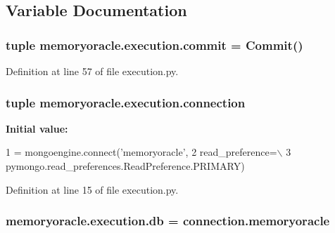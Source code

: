 \subsection{Variable Documentation}
\hypertarget{namespacememoryoracle_1_1execution_a1f4dd92e5fd65b6d5ac5d1631d09cf53}{}
\subsubsection[{commit}]{\setlength{\rightskip}{0pt plus 5cm}tuple memoryoracle.\+execution.\+commit = {\bf Commit}()}\label{namespacememoryoracle_1_1execution_a1f4dd92e5fd65b6d5ac5d1631d09cf53}


Definition at line 57 of file execution.\+py.

\hypertarget{namespacememoryoracle_1_1execution_a784a8c4d93752cd7436bde333f52572f}{}
\subsubsection[{connection}]{\setlength{\rightskip}{0pt plus 5cm}tuple memoryoracle.\+execution.\+connection}\label{namespacememoryoracle_1_1execution_a784a8c4d93752cd7436bde333f52572f}
{\bfseries Initial value\+:}
\begin{DoxyCode}
1 = mongoengine.connect(\textcolor{stringliteral}{'memoryoracle'},
2                     read\_preference=\(\backslash\)
3                             pymongo.read\_preferences.ReadPreference.PRIMARY)
\end{DoxyCode}


Definition at line 15 of file execution.\+py.

\hypertarget{namespacememoryoracle_1_1execution_ad0c5f80d3b0eb57b11ab6ab2a235858f}{}
\subsubsection[{db}]{\setlength{\rightskip}{0pt plus 5cm}memoryoracle.\+execution.\+db = connection.\+memoryoracle}\label{namespacememoryoracle_1_1execution_ad0c5f80d3b0eb57b11ab6ab2a235858f}


